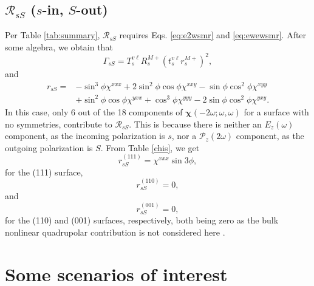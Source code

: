 
\subsection{\texorpdfstring{$\mathcal{R}_{sS}$ ($s$-in, $S$-out)}
{RsS (s-in, S-out)}}
\label{sec:RsS}

Per Table \ref{tab:summary}, $\mathcal{R}_{sS}$ requires Eqs. \eqref{eq:e2wsmr}
and \eqref{eq:ewewsmr}. After some algebra, we obtain that
\begin{equation}
\Gamma_{sS} = 
T_{s}^{v\ell}R^{M+}_{s}\left(t^{v\ell}_{s}r^{M+}_{s}\right)^{2},
\end{equation}
and
\begin{equation}
\begin{split}
r_{sS} = 
&- \sin^{3}\phi\chi^{xxx}
 + 2\sin^{2}\phi\cos\phi\chi^{xxy}
 - \sin\phi\cos^{2}\phi\chi^{xyy}\\
&+ \sin^{2}\phi\cos\phi\chi^{yxx}
 + \cos^{3}\phi\chi^{yyy}
 - 2\sin\phi\cos^{2}\phi\chi^{yxy}.
\end{split}
\end{equation}
In this case, only 6 out of the 18 components of
$\boldsymbol{\chi}(-2\omega;\omega,\omega)$ for a surface with no symmetries,
contribute to $\mathcal{R}_{sS}$. This is because there is neither an
$E_{z}(\omega)$ component, as the incoming polarization is $s$, nor a
$\mathcal{P}_{z}(2\omega)$ component, as the outgoing polarization is $S$. From
Table \ref{chis}, we get
\begin{equation}\label{eq:rss111}
r^{(111)}_{sS} = \chi^{xxx}\sin3\phi,
\end{equation}
for the (111) surface,
\begin{equation}\label{eq:rss110}
r^{(110)}_{sS} = 0,
\end{equation}
and
\begin{equation}\label{eq:rss001}
r^{(001)}_{sS} = 0,
\end{equation}
for the (110) and (001) surfaces, respectively, both being zero as the bulk
nonlinear quadrupolar contribution is not considered here \cite{sipePRB87}.



\section{Some scenarios of interest}\label{sec:scenarios}

